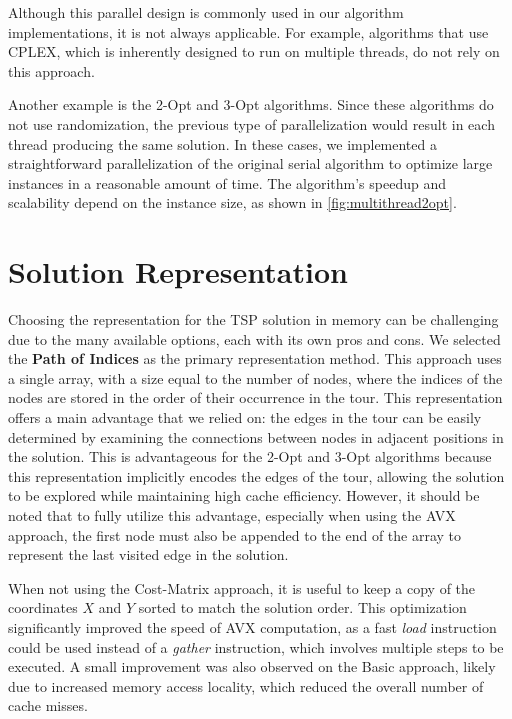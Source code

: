 Although this parallel design is commonly used in our algorithm implementations, it is not always applicable.
For example, algorithms that use CPLEX, which is inherently designed to run on multiple threads, do not rely on this approach.

Another example is the 2-Opt and 3-Opt algorithms.
Since these algorithms do not use randomization, the previous type of parallelization would result in each thread producing the same solution.
In these cases, we implemented a straightforward parallelization of the original serial algorithm to optimize large instances in a reasonable amount of time.
The algorithm's speedup and scalability depend on the instance size, as shown in \figurename{ \ref{fig:multithread2opt}}.

\section{Solution Representation}

Choosing the representation for the TSP solution in memory can be challenging due to the many available options, each with its own pros and cons.
We selected the \textbf{Path of Indices} as the primary representation method.
This approach uses a single array, with a size equal to the number of nodes, where the indices of the nodes are stored in the order of their occurrence in the tour.
This representation offers a main advantage that we relied on: the edges in the tour can be easily determined by examining the connections between nodes in adjacent positions in the solution.
This is advantageous for the 2-Opt and 3-Opt algorithms because this representation implicitly encodes the edges of the tour, allowing the solution to be explored while maintaining high cache efficiency.
However, it should be noted that to fully utilize this advantage, especially when using the AVX approach, the first node must also be appended to the end of the array to represent the last visited edge in the solution.

When not using the Cost-Matrix approach, it is useful to keep a copy of the coordinates $X$ and $Y$ sorted to match the solution order.
This optimization significantly improved the speed of AVX computation, as a fast \textit{load} instruction could be used instead of a \textit{gather} instruction, which involves multiple steps to be executed.
A small improvement was also observed on the Basic approach, likely due to increased memory access locality, which reduced the overall number of cache misses.

